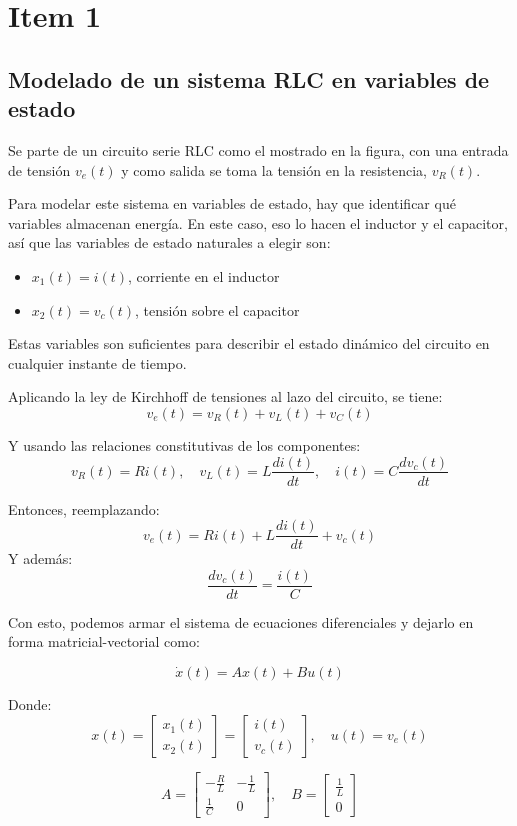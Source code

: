 \documentclass{article}
\begin{document}
\section{Item 1}
\subsection{Modelado de un sistema RLC en variables de estado}

Se parte de un circuito serie RLC como el mostrado en la figura, con una entrada de tensión $v_e(t)$ y como salida se toma la tensión en la resistencia, $v_R(t)$.

Para modelar este sistema en variables de estado, hay que identificar qué variables almacenan energía. En este caso, eso lo hacen el inductor y el capacitor, así que las variables de estado naturales a elegir son:

\begin{itemize}
    \item $x_1(t) = i(t)$, corriente en el inductor
    \item $x_2(t) = v_c(t)$, tensión sobre el capacitor
\end{itemize}

Estas variables son suficientes para describir el estado dinámico del circuito en cualquier instante de tiempo.

Aplicando la ley de Kirchhoff de tensiones al lazo del circuito, se tiene:
\[
v_e(t) = v_R(t) + v_L(t) + v_C(t)
\]

Y usando las relaciones constitutivas de los componentes:
\[
v_R(t) = Ri(t), \quad v_L(t) = L\frac{di(t)}{dt}, \quad i(t) = C\frac{dv_c(t)}{dt}
\]

Entonces, reemplazando:
\[
v_e(t) = R i(t) + L \frac{di(t)}{dt} + v_c(t)
\]
Y además:
\[
\frac{dv_c(t)}{dt} = \frac{i(t)}{C}
\]

Con esto, podemos armar el sistema de ecuaciones diferenciales y dejarlo en forma matricial-vectorial como:

\[
\dot{x}(t) = A x(t) + B u(t)
\]

Donde:
\[
x(t) =
\begin{bmatrix}
x_1(t) \\
x_2(t)
\end{bmatrix}
=
\begin{bmatrix}
i(t) \\
v_c(t)
\end{bmatrix},
\quad
u(t) = v_e(t)
\]

\[
A = 
\begin{bmatrix}
-\frac{R}{L} & -\frac{1}{L} \\
\frac{1}{C} & 0
\end{bmatrix}, \quad
B =
\begin{bmatrix}
\frac{1}{L} \\
0
\end{bmatrix}
\]
\end{document}
